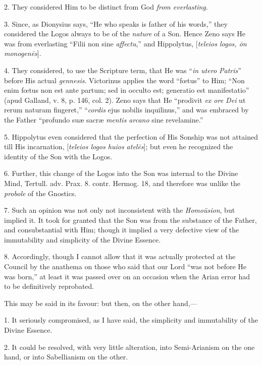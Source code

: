 2. They considered Him to be distinct from God \emph{from everlasting}.

3. Since, as Dionysius says, ``He who speaks is father of his
words,'' they considered the Logos always to be of the \emph{nature}
of a Son. Hence Zeno says He was from everlasting ``Filii
non sine \emph{affectu},'' and Hippolytus, [\emph{teleios logos, \={o}n
monogen\={e}s}].

4. They considered, to use the Scripture term, that He was ``\emph{in
utero Patris}'' before His actual \emph{gennesis}. Victorinus
applies the word ``fœtus'' to Him; ``Non enim fœtus non
est ante partum; sed in occulto est; generatio est manifestatio''
(apud Galland, v. 8, p. 146, col. 2). Zeno says that He ``prodivit
\emph{ex ore Dei} ut rerum naturam fingeret,'' ``\emph{cordis}
ejus nobilis inquilinus,'' and was embraced by the Father ``profundo
suæ sacræ \emph{mentis arcano} sine revelamine.''

5. Hippolytus even considered that the perfection of His Sonship
was not attained till His incarnation, [\emph{teleios logos huios atel\={e}s}];
but even he recognized the identity of the Son with the Logos.

6. Further, this change of the Logos into the Son was internal to
the Divine Mind, Tertull. adv. Prax. 8. contr. Hermog. 18, and
therefore was unlike the \emph{probole} of the Gnostics.

7. Such an opinion was not only not inconsistent with the \emph{Homoüsion},
but implied it. It took for granted that the Son was from the
substance of the Father, and consubstantial with Him; though it
implied a very defective view of the immutability and simplicity of
the Divine Essence.

8. Accordingly, though I cannot allow that it was actually
protected at the Council by the anathema on those who said that our
Lord ``was not before He was born,'' at least it was passed
over on an occasion when the Arian error had to be definitively
reprobated.

This may be said in its favour: but then, on the other hand,—

1. It seriously compromised, as I have said, the simplicity and
immutability of the Divine Essence.

2. It could be resolved, with very little alteration, into
Semi-Arianism on the one hand, or into Sabellianism on the other.

